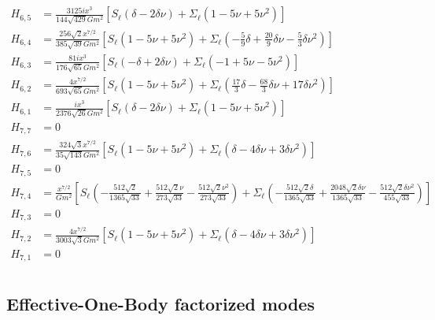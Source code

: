 \documentclass[
superscriptaddress,
preprint,
prd,tightenlines,showpacs,nofootinbib,
eqsecnum,
amsfonts,amsmath,amssymb]{revtex4-1}
\begin{document}
\begin{subequations}
\begin{align}
H_{6,5} &= \frac{3125i x^3}{144 \sqrt{429} G m^2}\left[S_{\ell} (\delta - 2 \delta \nu) + \Sigma_{\ell} (1 - 5 \nu + 5 \nu^2)\right] \\
H_{6,4} &= \frac{256 \sqrt{2} x^{7/2}}{385 \sqrt{39} G m^2}\left[S_{\ell} (1 - 5 \nu + 5 \nu^2) + \Sigma_{\ell} (- \tfrac{5}{9} \delta + \tfrac{20}{9} \delta \nu -  \tfrac{5}{3} \delta \nu^2)\right] \\
H_{6,3} &= \frac{81i x^3}{176 \sqrt{65} G m^2}\left[S_{\ell} (- \delta + 2 \delta \nu) + \Sigma_{\ell} (-1 + 5 \nu - 5 \nu^2)\right] \\
H_{6,2} &= \frac{4 x^{7/2}}{693 \sqrt{65} G m^2}\left[S_{\ell} (1 - 5 \nu + 5 \nu^2) + \Sigma_{\ell} (\tfrac{17}{3} \delta -  \tfrac{68}{3} \delta \nu + 17 \delta \nu^2)\right] \\
H_{6,1} &= \frac{i x^3}{2376 \sqrt{26} G m^2}\left[S_{\ell} (\delta - 2 \delta \nu) + \Sigma_{\ell} (1 - 5 \nu + 5 \nu^2)\right] \\
H_{7,7} &= 0 \\H_{7,6} &= \frac{324 \sqrt{3} x^{7/2}}{35 \sqrt{143} G m^2}\left[S_{\ell} (1 - 5 \nu + 5 \nu^2) + \Sigma_{\ell} (\delta - 4 \delta \nu + 3 \delta \nu^2)\right] \\
H_{7,5} &= 0 \\H_{7,4} &= \frac{x^{7/2}}{G m^2}\left[S_{\ell} (- \frac{512 \sqrt{2}}{1365 \sqrt{33}} + \frac{512 \sqrt{2} \nu}{273 \sqrt{33}} -  \frac{512 \sqrt{2} \nu^2}{273 \sqrt{33}}) + \Sigma_{\ell} (- \frac{512 \sqrt{2} \delta}{1365 \sqrt{33}} + \frac{2048 \sqrt{2} \delta \nu}{1365 \sqrt{33}} -  \frac{512 \sqrt{2} \delta \nu^2}{455 \sqrt{33}})\right] \\
H_{7,3} &= 0 \\H_{7,2} &= \frac{4 x^{7/2}}{3003 \sqrt{3} G m^2}\left[S_{\ell} (1 - 5 \nu + 5 \nu^2) + \Sigma_{\ell} (\delta - 4 \delta \nu + 3 \delta \nu^2)\right] \\
H_{7,1} &= 0 \\
\end{align}\end{subequations}


\subsection{Effective-One-Body factorized modes}
\label{subsec:eob} 

\begin{subequations}























\end{subequations}
\end{document}
